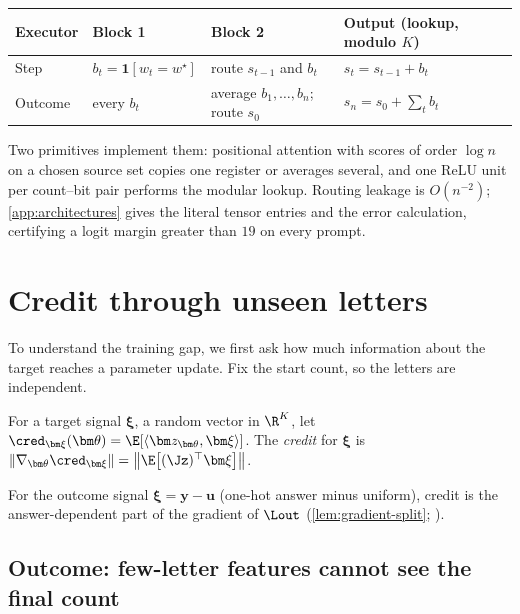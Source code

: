 \begin{center}
\small
\begin{tabular}{@{}llll@{}}
\toprule
Executor & Block 1 & Block 2 & Output (lookup, modulo $K$)\\
\midrule
Step & $b_t=\mathbf 1[w_t=w^\star]$ & route $s_{t-1}$ and $b_t$ & $s_t=s_{t-1}+b_t$\\
Outcome & every $b_t$ & average $b_1,\ldots,b_n$; route $s_0$ & $s_n=s_0+\sum_tb_t$\\
\bottomrule
\end{tabular}
\end{center}
Two primitives implement them: positional attention with scores of order $\log n$ on a chosen source set copies one register or
averages several, and one ReLU unit per count--bit pair performs the modular lookup. Routing leakage is $O(n^{-2})$;
\cref{app:architectures} gives the literal tensor entries and the error calculation, certifying a logit margin greater than $19$ on every
prompt.

\section{Credit through unseen letters}
\label{sec:credit}

To understand the training gap, we first ask how much information about the target reaches a parameter update.
Fix the start count, so the letters are independent.

\begin{definition}[Credit]
\label{def:credit}
For a target signal $\bm\xi$, a random vector in $\R^K$, let $\cred_{\bm\xi}(\bm\theta)=\E[\langle\bm z_{\bm\theta},\bm\xi\rangle]$. The
\emph{credit} for $\bm\xi$ is $\|\nabla_{\bm\theta}\cred_{\bm\xi}\|=\bigl\|\E\bigl[(\Jz)^\top\bm\xi\bigr]\bigr\|$.
\end{definition}

For the outcome signal $\bm\xi=\bm y-\bm u$ (one-hot answer minus uniform), credit is the answer-dependent part of the gradient of
$\Lout$ (\cref{lem:gradient-split}; \citealp{shalevshwartz2017failures,abbe2025parities}).

\subsection{Outcome: few-letter features cannot see the final count}
